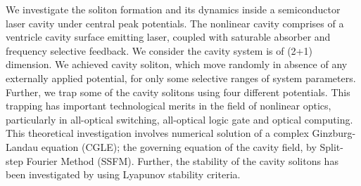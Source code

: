 We investigate the soliton formation and its dynamics inside a semiconductor laser cavity under central peak potentials. The nonlinear cavity comprises of a ventricle cavity surface emitting laser, coupled with saturable absorber and frequency selective feedback. We consider the cavity system is of (2+1) dimension. We achieved cavity soliton, which move randomly in absence of any externally applied potential, for only some selective ranges of system parameters. Further, we trap some of the cavity solitons using four different  potentials. This trapping has important technological merits 
in the field of nonlinear optics, particularly in all-optical switching, all-optical logic gate and optical computing.
This theoretical investigation involves numerical solution of a complex Ginzburg-Landau equation (CGLE); the governing equation of the cavity field, by Split-step Fourier Method (SSFM). Further, the stability of the cavity solitons has been investigated by using Lyapunov stability criteria. 